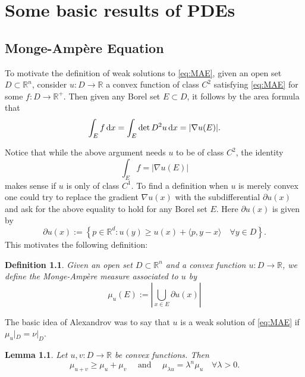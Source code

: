 \documentclass[twoside, 12pt]{book}
\numberwithin{equation}{chapter}
\def\theequation{\arabic{chapter}.\arabic{equation}}
\newtheorem{lemma}[theorem]{Lemma}
\newtheorem{definition}[theorem]{Definition}
\def\mR{{\mathbb R}}
\def\geq{\geqslant}
\def\p{\partial}
\def\d{\text{\rm{d}}}
\begin{document}
	
	
	\chapter{Some basic results of  PDEs} 
	
	\section{Monge-Ampère Equation}\label{app:MAE}
     \setcounter{equation}{0}
     \renewcommand\theequation{B.\arabic{equation}}
	To motivate the definition of weak solutions to \eqref{eq:MAE}, given an open set $D \subset \mathbb{R}^n$, consider $u: D \rightarrow \mathbb{R}$ a convex function of class $C^2$ satisfying \eqref{eq:MAE} 
	for some $f: D \rightarrow \mathbb{R}^{+}$. Then given any Borel set $E \subset D$, it follows by the area formula that
	$$
	\int_E f \,\d x=\int_E \operatorname{det} D^2 u\, \d x=|\nabla u(E)| .
	$$
	
	Notice that while the above argument needs $u$ to be of class $C^2$, the identity
	$$
	\int_E f=|\nabla u(E)|
	$$
	makes sense if $u$ is only of class $C^1$. To find a definition when $u$ is merely convex one could try to replace the gradient $\nabla u(x)$ with the subdifferential $\partial u(x)$ and ask for the above equality to hold for any Borel set $E$. Here $\p u(x)$ is given by 
	$$
	\partial u(x):=\left\{p \in \mathbb{R}^d: u(y) \geq u(x)+\langle p, y-x\rangle \quad \forall y \in D\right\}. 
	$$
	This motivates the following definition:
	\begin{definition}
		Given an open set $D \subset \mathbb{R}^n$ and a convex function $u: D \rightarrow \mathbb{R}$, we define the Monge-Ampère measure associated to $u$ by
		$$
		\mu_u(E):=\left|\bigcup_{x \in E} \partial u(x)\right|
		$$
	\end{definition}
	The basic idea of Alexandrov was to say that $u$ is a weak solution
	of \eqref{eq:MAE} if $\mu_u|_{D}=\nu|_{D}$. 
	
	\begin{lemma}
		Let $u,v:D\to \mR$ be convex functions. Then 
		$$
		\mu_{u+v} \geq \mu_u+\mu_v \quad \text { and } \quad \mu_{\lambda u}=\lambda^n \mu_u \quad \forall \lambda>0 .
		$$
	\end{lemma}
	
	\medspace
	
\end{document}
